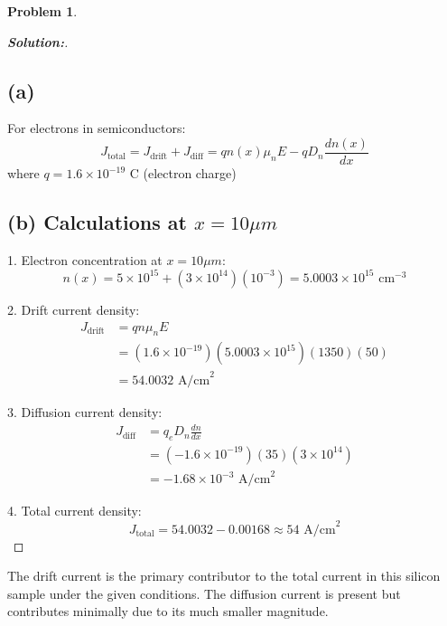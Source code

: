 \documentclass[12pt]{article}
\theoremstyle{definition}\newtheorem{problem}{Problem}
\newenvironment{solution}{\begin{proof}[\bfseries\textup{Solution:}]}{\end{proof}}
\begin{document}
\newpage
\begin{problem}

\end{problem}
\begin{solution}
    \subsection*{(a)}

For electrons in semiconductors:
$$
J_{\text{total}} = J_{\text{drift}} + J_{\text{diff}} = q n(x) \mu_n E - q D_n \frac{dn(x)}{dx}
$$
where $q = 1.6 \times 10^{-19}$ C (electron charge)

\subsection*{(b) Calculations at $x = 10 \mu m$ }

1. Electron concentration at $x = 10 \mu m$:
$$
n(x) = 5 \times 10^{15} + (3 \times 10^{14})(10^{-3}) = 5.0003 \times 10^{15} \text{ cm}^{-3}
$$

2. Drift current density:
\begin{align*}
J_{\text{drift}} &= q n \mu_n E \\
&= (1.6 \times 10^{-19})(5.0003 \times 10^{15})(1350)(50) \\
&= 54.0032 \text{ A/cm}^2
\end{align*}

3. Diffusion current density:
\begin{align*}
J_{\text{diff}} &= q_e D_n \frac{dn}{dx} \\
&= (-1.6 \times 10^{-19})(35)(3 \times 10^{14}) \\
&= -1.68 \times 10^{-3} \text{ A/cm}^2
\end{align*}

4. Total current density:
$$
J_{\text{total}} = 54.0032 - 0.00168 \approx 54 \text{ A/cm}^2
$$


\end{solution}
The drift current is the primary contributor to the total current in this silicon sample under the given conditions.
The diffusion current is present but contributes minimally due to its much smaller magnitude.
\end{document}
